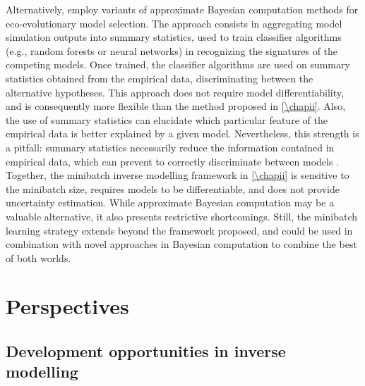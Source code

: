 % 
Alternatively, \cite{Sukumaran2016,Skeels2019,Skeels2022} employ variants of approximate Bayesian computation methods \citep{Csillery2010} for eco-evolutionary model selection. The approach consists in aggregating model simulation outputs into summary statistics, used to train classifier algorithms (e.g., random forests or neural networks) in recognizing the signatures of the competing models. Once trained, the classifier algorithms are used on summary statistics obtained from the empirical data, discriminating between the alternative hypotheses. 
% 
This approach does not require model differentiability, and is consequently more flexible than the method proposed in \cref{\chapii}. Also, the use of summary statistics can elucidate which particular feature of the empirical data is better explained by a given model. 
% 
Nevertheless, this strength is a pitfall: summary statistics necessarily reduce the information contained in empirical data, which can prevent to correctly discriminate between models \citep{Csillery2010}.
% 
Together, the minibatch inverse modelling framework in \cref{\chapii} is sensitive to the minibatch size, requires models to be differentiable, and does not provide uncertainty estimation. While approximate Bayesian computation may be a valuable alternative, it also presents restrictive shortcomings. Still, the minibatch learning strategy extends beyond the framework proposed, and could be used in combination with novel approaches in Bayesian computation to combine the best of both worlds.

\section{Perspectives}

\subsection{Development opportunities in inverse modelling}

